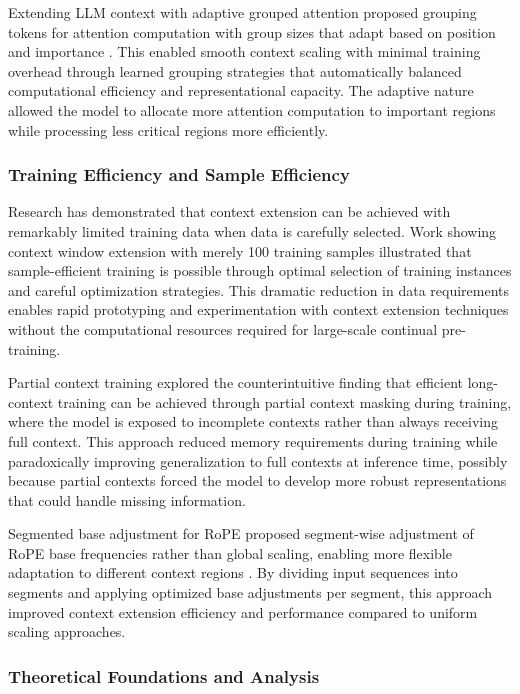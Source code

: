Extending LLM context with adaptive grouped attention proposed grouping tokens for attention computation with group sizes that adapt based on position and importance \citep{chang2025extending}. This enabled smooth context scaling with minimal training overhead through learned grouping strategies that automatically balanced computational efficiency and representational capacity. The adaptive nature allowed the model to allocate more attention computation to important regions while processing less critical regions more efficiently.

\subsubsection{Training Efficiency and Sample Efficiency}

Research has demonstrated that context extension can be achieved with remarkably limited training data when data is carefully selected. Work showing context window extension with merely 100 training samples illustrated that sample-efficient training is possible through optimal selection of training instances and careful optimization strategies. This dramatic reduction in data requirements enables rapid prototyping and experimentation with context extension techniques without the computational resources required for large-scale continual pre-training.

Partial context training explored the counterintuitive finding that efficient long-context training can be achieved through partial context masking during training, where the model is exposed to incomplete contexts rather than always receiving full context. This approach reduced memory requirements during training while paradoxically improving generalization to full contexts at inference time, possibly because partial contexts forced the model to develop more robust representations that could handle missing information.

Segmented base adjustment for RoPE proposed segment-wise adjustment of RoPE base frequencies rather than global scaling, enabling more flexible adaptation to different context regions \citep{kim2024extending}. By dividing input sequences into segments and applying optimized base adjustments per segment, this approach improved context extension efficiency and performance compared to uniform scaling approaches.

\subsubsection{Theoretical Foundations and Analysis}

